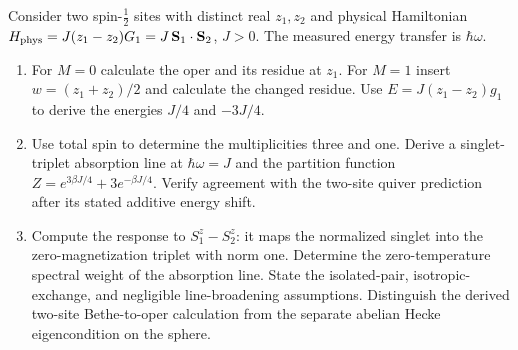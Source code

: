 \begin{exercise}
Consider two spin-$\tfrac12$ sites with distinct real $z_1,z_2$
and physical Hamiltonian
$H_{\rm phys}=J(z_1-z_2)G_1=J\,\mathbf S_1\cdot\mathbf S_2$,
$J>0$. The measured energy transfer is $\hbar\omega$.
\begin{enumerate}[label=(\alph*)]
\item For $M=0$ calculate the oper and its residue at $z_1$.
For $M=1$ insert $w=(z_1+z_2)/2$ and calculate the changed
residue. Use $E=J(z_1-z_2)g_1$ to derive the energies
$J/4$ and $-3J/4$.
\item Use total spin to determine the multiplicities three
and one. Derive a singlet-triplet absorption line at
$\hbar\omega=J$ and the partition function
$Z=e^{3\beta J/4}+3e^{-\beta J/4}$.
Verify agreement with the two-site quiver prediction after
its stated additive energy shift.
\item Compute the response to
$S_1^z-S_2^z$: it maps the normalized singlet into the
zero-magnetization triplet with norm one. Determine the
zero-temperature spectral weight of the absorption line.
State the isolated-pair, isotropic-exchange, and negligible
line-broadening assumptions. Distinguish the derived
two-site Bethe-to-oper calculation from the separate
abelian Hecke eigencondition on the sphere.
\end{enumerate}
\end{exercise}
